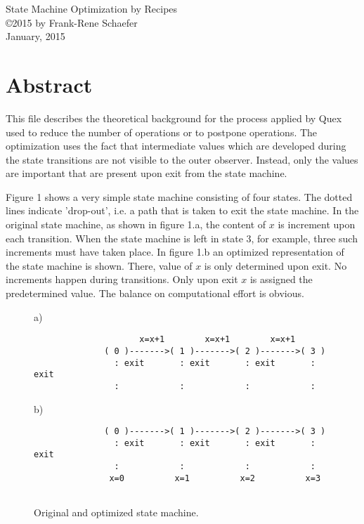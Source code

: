 \documentclass[12pt,a4paper]{scrartcl}
\theoremstyle{break}
\begin{document}
\begin{center}
{\large State Machine Optimization by Recipes} \\ 
\copyright 2015 by Frank-Rene Schaefer         \\
January, 2015
\end{center}

%
\section{Abstract}

This file describes the theoretical background for the process applied by Quex
used to reduce the number of operations or to postpone operations.  The
optimization uses the fact that intermediate values which are developed during
the state transitions are not visible to the outer observer. Instead, only the
values are important that are present upon exit from the state machine.

Figure 1 shows a very simple state machine consisting of four states.  The
dotted lines indicate 'drop-out', i.e. a path that is taken to exit the state
machine.  In the original state machine, as shown in figure 1.a, the content of
$x$ is increment upon each transition. When the state machine is left in state
3, for example, three such increments must have taken place. In figure 1.b an
optimized representation of the state machine is shown.  There, value of $x$ is
only determined upon exit.  No increments happen during transitions. Only upon
exit $x$ is assigned the predetermined value. The balance on computational
effort is obvious.

\begin{figure}[htbp] \leavevmode
a)
\begin{verbatim}
                     x=x+1        x=x+1        x=x+1
              ( 0 )------->( 1 )------->( 2 )------->( 3 )
                : exit       : exit       : exit       : exit
                :            :            :            :
\end{verbatim}
    
b)
\begin{verbatim}
              ( 0 )------->( 1 )------->( 2 )------->( 3 )
                : exit       : exit       : exit       : exit
                :            :            :            :
               x=0          x=1          x=2          x=3
    
\end{verbatim}
\caption{Original and optimized state machine.}
\end{figure}
                 
\end{document}
